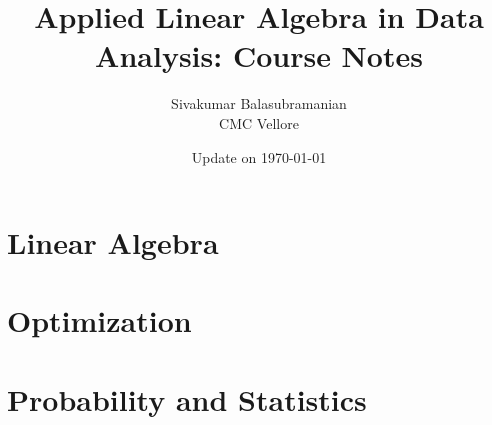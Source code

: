 \documentclass[11pt,twoside]{book}
\begin{document}
\title{\bf \huge Applied Linear Algebra in Data Analysis: Course Notes}
\author{Sivakumar Balasubramanian \\ CMC Vellore}
\date{Update on \today}
\maketitle
\setcounter{tocdepth}{2}
\setcounter{minitocdepth}{1} 

\begin{multicols}{2}
    \dominitoc%
    \adjustmtc[2]%
    \tableofcontents
    \label{toc-contents}
\end{multicols}

\listoffigures

\printglossary


% 

\part{Linear Algebra}


\part{Optimization}

\part{Probability and Statistics}
\end{document}
